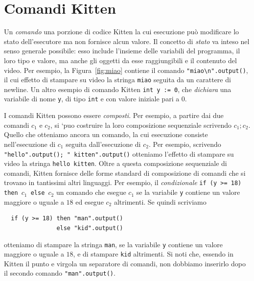 \section{Comandi Kitten}\label{sec:commands}
%
Un \emph{comando} \e una porzione di codice Kitten la cui esecuzione
pu\`o modificare lo stato dell'esecutore ma non fornisce alcun valore.
Il concetto di \emph{stato} va inteso nel senso \piu
generale possibile: esso include l'insieme delle variabili del programma,
il loro tipo e valore, ma anche gli oggetti da esse raggiungibili
e il contenuto del video. Per esempio, la Figura~\ref{fig:miao} contiene il
comando \verb|"miao\n".output()|, il cui effetto \e di stampare su video
la stringa \texttt{miao} seguita da un carattere di newline.
Un altro esempio di comando Kitten \e \verb|int y := 0|, che \emph{dichiara}
una variabile di nome \texttt{y}, di tipo \texttt{int} e con valore iniziale
pari a $0$.

I comandi Kitten
possono essere \emph{composti}. Per esempio, a partire dai due comandi
$c_1$ e $c_2$, si `puo costruire la loro composizione sequenziale
scrivendo $c_1;c_2$. Quello che otteniamo
\e ancora un comando, la cui esecuzione consiste nell'esecuzione di $c_1$
seguita dall'esecuzione di $c_2$. Per esempio, scrivendo
\verb|"hello".output(); " kitten".output()| otteniamo l'effetto di
stampare su video la stringa \texttt{hello kitten}. Oltre a questa
composizione sequenziale di comandi, Kitten fornisce delle forme
standard di composizione di comandi che si trovano in tantissimi altri
linguaggi. Per esempio, il \emph{condizionale}
\texttt{if (y >= 18) then }$c_1$\texttt{ else }$c_2$
\e un comando che esegue $c_1$ se la variabile \texttt{y} contiene un valore
maggiore o uguale a $18$ ed esegue $c_2$ altrimenti. Se quindi scriviamo
%
\begin{verbatim}
  if (y >= 18) then "man".output()
               else "kid".output()
\end{verbatim}
%
otteniamo di stampare la stringa \texttt{man}, se la variabile \texttt{y}
contiene un valore maggiore o uguale a $18$, e di stampare
\texttt{kid} altrimenti.
Si noti che, essendo in Kitten il punto e virgola un separatore di comandi,
non dobbiamo inserirlo dopo il secondo comando \verb|"man".output()|.

